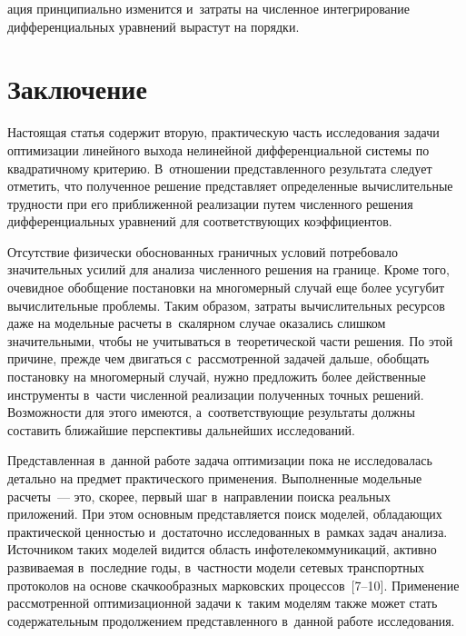 \begin{multicols}{2}

\noindent
ация 
принципиально изменится и~затраты на чис\-лен\-ное интегрирование 
дифференциальных уравнений вырастут на порядки.

\vspace*{-9pt}



\section{Заключение}

\vspace*{-2pt}

     Настоящая статья содержит вторую, практическую часть исследования 
задачи оптимизации линейного выхода нелинейной дифференциальной 
системы по квадратичному критерию. В~отношении представленного 
результата следует отметить, что полученное решение представляет 
определенные вычислительные трудности при его приближенной реализации 
путем численного решения дифференциальных уравнений для 
соответствующих коэффициентов. 

Отсутствие физически обоснованных 
граничных условий потребовало значительных усилий для анализа 
численного решения на границе. Кроме того, очевидное обобщение 
постановки на многомерный случай  еще более 
усугубит вычислительные проблемы. Таким образом, затраты вы\-чис\-ли\-тель\-ных ресурсов даже на 
модельные расчеты в~скалярном случае оказались слишком значительными, 
чтобы не учитываться в~теоретической час\-ти решения. По этой причине, 
прежде чем двигаться с~рассмотренной задачей дальше, обобщать постановку 
на многомерный случай, нуж\-но предложить более действенные инструменты 
в~час\-ти чис\-лен\-ной реализации полученных точных решений. Возможности 
для этого имеются, а~соответствующие результаты должны составить 
ближайшие перспективы дальнейших исследований.
     
     Представленная в~данной работе задача оптимизации пока не 
исследовалась детально на предмет практического применения. 
Выполненные модельные расчеты~--- это, скорее, первый шаг в~на\-прав\-ле\-нии 
поиска реальных приложений. При этом основным представляется поиск 
моделей, обладающих практической ценностью и~достаточно исследованных 
в~рамках задач анализа. Источником таких моделей видится область 
инфотелекоммуникаций, активно развиваемая в~последние годы, в~част\-ности 
модели сетевых транспортных протоколов на основе скачкообразных 
марковских процессов~[7--10]. Применение рассмотренной 
оптимизационной задачи к~таким моделям также может стать 
содержательным продолжением представленного в~данной работе 
исследования.


\end{multicols}
